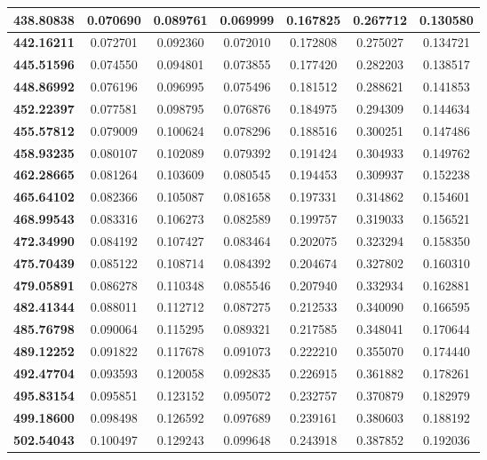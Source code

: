 \documentclass[10pt, a4paper]{article}
\begin{document}
\begin{appendices}
\begin{longtable}{|c|c|c|c|c|c|c|}
\textbf{438.80838} & 0.070690 & 0.089761 & 0.069999 & 0.167825 & 0.267712 & 0.130580 \\ \hline
\textbf{442.16211} & 0.072701 & 0.092360 & 0.072010 & 0.172808 & 0.275027 & 0.134721 \\ \hline
\textbf{445.51596} & 0.074550 & 0.094801 & 0.073855 & 0.177420 & 0.282203 & 0.138517 \\ \hline
\textbf{448.86992} & 0.076196 & 0.096995 & 0.075496 & 0.181512 & 0.288621 & 0.141853 \\ \hline
\textbf{452.22397} & 0.077581 & 0.098795 & 0.076876 & 0.184975 & 0.294309 & 0.144634 \\ \hline
\textbf{455.57812} & 0.079009 & 0.100624 & 0.078296 & 0.188516 & 0.300251 & 0.147486 \\ \hline
\textbf{458.93235} & 0.080107 & 0.102089 & 0.079392 & 0.191424 & 0.304933 & 0.149762 \\ \hline
\textbf{462.28665} & 0.081264 & 0.103609 & 0.080545 & 0.194453 & 0.309937 & 0.152238 \\ \hline
\textbf{465.64102} & 0.082366 & 0.105087 & 0.081658 & 0.197331 & 0.314862 & 0.154601 \\ \hline
\textbf{468.99543} & 0.083316 & 0.106273 & 0.082589 & 0.199757 & 0.319033 & 0.156521 \\ \hline
\textbf{472.34990} & 0.084192 & 0.107427 & 0.083464 & 0.202075 & 0.323294 & 0.158350 \\ \hline
\textbf{475.70439} & 0.085122 & 0.108714 & 0.084392 & 0.204674 & 0.327802 & 0.160310 \\ \hline
\textbf{479.05891} & 0.086278 & 0.110348 & 0.085546 & 0.207940 & 0.332934 & 0.162881 \\ \hline
\textbf{482.41344} & 0.088011 & 0.112712 & 0.087275 & 0.212533 & 0.340090 & 0.166595 \\ \hline
\textbf{485.76798} & 0.090064 & 0.115295 & 0.089321 & 0.217585 & 0.348041 & 0.170644 \\ \hline
\textbf{489.12252} & 0.091822 & 0.117678 & 0.091073 & 0.222210 & 0.355070 & 0.174440 \\ \hline
\textbf{492.47704} & 0.093593 & 0.120058 & 0.092835 & 0.226915 & 0.361882 & 0.178261 \\ \hline
\textbf{495.83154} & 0.095851 & 0.123152 & 0.095072 & 0.232757 & 0.370879 & 0.182979 \\ \hline
\textbf{499.18600} & 0.098498 & 0.126592 & 0.097689 & 0.239161 & 0.380603 & 0.188192 \\ \hline
\textbf{502.54043} & 0.100497 & 0.129243 & 0.099648 & 0.243918 & 0.387852 & 0.192036 \\ \hline

\end{longtable}
\end{appendices}
\end{document}
